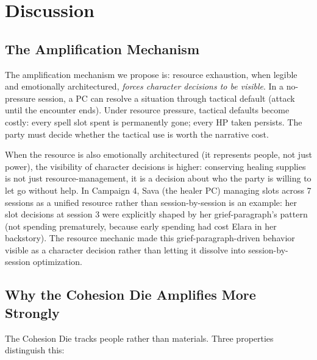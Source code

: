 
\section{Discussion}
\label{sec:discussion}

\subsection{The Amplification Mechanism}

The amplification mechanism we propose is: resource exhaustion, when legible and
emotionally architectured, \textit{forces character decisions to be visible}. In a
no-pressure session, a PC can resolve a situation through tactical default (attack
until the encounter ends). Under resource pressure, tactical defaults become costly:
every spell slot spent is permanently gone; every HP taken persists. The party must
decide whether the tactical use is worth the narrative cost.

When the resource is also emotionally architectured (it represents people, not just
power), the visibility of character decisions is higher: conserving healing supplies
is not just resource-management, it is a decision about who the party is willing to
let go without help. In Campaign 4, Sava (the healer PC) managing slots across 7
sessions as a unified resource rather than session-by-session is an example: her
slot decisions at session 3 were explicitly shaped by her grief-paragraph's pattern
(not spending prematurely, because early spending had cost Elara in her backstory).
The resource mechanic made this grief-paragraph-driven behavior visible as a character
decision rather than letting it dissolve into session-by-session optimization.

\subsection{Why the Cohesion Die Amplifies More Strongly}

The Cohesion Die tracks people rather than materials. Three properties distinguish this:

